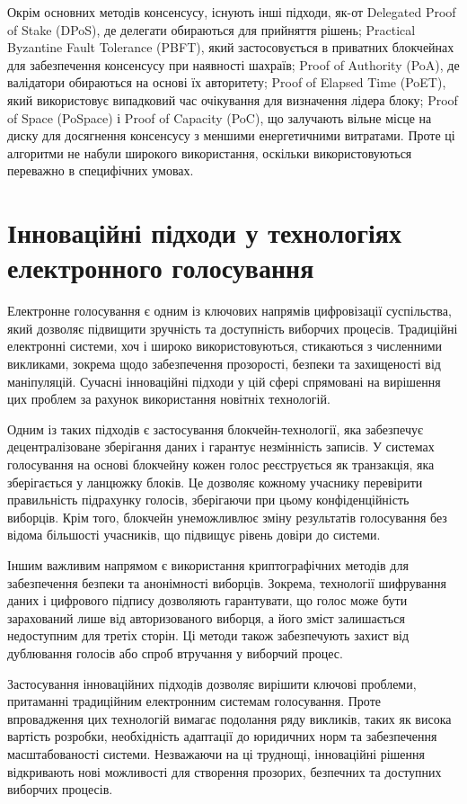 \documentclass[14pt]{extreport}
\begin{document}
  Окрім основних методів консенсусу, існують інші підходи, як-от Delegated Proof of Stake (DPoS), де делегати обираються для прийняття рішень; Practical Byzantine Fault Tolerance (PBFT), який застосовується в приватних блокчейнах для забезпечення консенсусу при наявності шахраїв; Proof of Authority (PoA), де валідатори обираються на основі їх авторитету; Proof of Elapsed Time (PoET), який використовує випадковий час очікування для визначення лідера блоку; Proof of Space (PoSpace) і Proof of Capacity (PoC), що залучають вільне місце на диску для досягнення консенсусу з меншими енергетичними витратами. Проте ці алгоритми не набули широкого використання, оскільки використовуються переважно в специфічних умовах.
  
  \section{Інноваційні підходи у технологіях електронного голосування}
  
    Електронне голосування є одним із ключових напрямів цифровізації суспільства, який дозволяє підвищити зручність та доступність виборчих процесів. Традиційні електронні системи, хоч і широко використовуються, стикаються з численними викликами, зокрема щодо забезпечення прозорості, безпеки та захищеності від маніпуляцій. Сучасні інноваційні підходи у цій сфері спрямовані на вирішення цих проблем за рахунок використання новітніх технологій.

  Одним із таких підходів є застосування блокчейн-технології, яка забезпечує децентралізоване зберігання даних і гарантує незмінність записів. У системах голосування на основі блокчейну кожен голос реєструється як транзакція, яка зберігається у ланцюжку блоків. Це дозволяє кожному учаснику перевірити правильність підрахунку голосів, зберігаючи при цьому конфіденційність виборців. Крім того, блокчейн унеможливлює зміну результатів голосування без відома більшості учасників, що підвищує рівень довіри до системи.

  Іншим важливим напрямом є використання криптографічних методів для забезпечення безпеки та анонімності виборців. Зокрема, технології шифрування даних і цифрового підпису дозволяють гарантувати, що голос може бути зарахований лише від авторизованого виборця, а його зміст залишається недоступним для третіх сторін. Ці методи також забезпечують захист від дублювання голосів або спроб втручання у виборчий процес.

  Застосування інноваційних підходів дозволяє вирішити ключові проблеми, притаманні традиційним електронним системам голосування. Проте впровадження цих технологій вимагає подолання ряду викликів, таких як висока вартість розробки, необхідність адаптації до юридичних норм та забезпечення масштабованості системи. Незважаючи на ці труднощі, інноваційні рішення відкривають нові можливості для створення прозорих, безпечних та доступних виборчих процесів.
  
\end{document}
